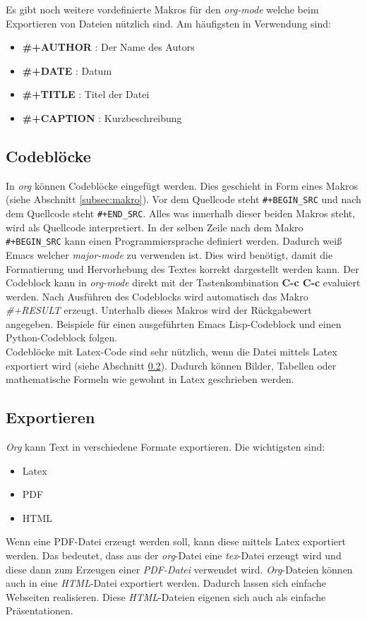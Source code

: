 Es gibt noch weitere vordefinierte Makros für den \textit{org-mode}
welche beim Exportieren von Dateien nützlich sind. Am häufigsten in
Verwendung sind:
\begin{itemize}
\item \textbf{\#+AUTHOR} : Der Name des Autors
\item \textbf{\#+DATE} : Datum
\item \textbf{\#+TITLE} : Titel der Datei
\item \textbf{\#+CAPTION} : Kurzbeschreibung
\end{itemize}

\subsection{Codeblöcke}
In \textit{org} können Codeblöcke eingefügt werden. Dies geschieht in
Form eines Makros (siehe Abschnitt \ref{subsec:makro}). Vor dem
Quellcode steht \texttt{\#+BEGIN\_SRC} und nach dem Quellcode steht
\texttt{\#+END\_SRC}. Alles was innerhalb dieser beiden Makros steht,
wird als Quellcode interpretiert. In der selben Zeile nach dem Makro
{\glqq}\texttt{\#+BEGIN\_SRC}{\grqq} kann einen Programmiersprache
definiert werden. Dadurch weiß Emacs welcher \textit{major-mode} zu
verwenden ist. Dies wird benötigt, damit die Formatierung und
Hervorhebung des Textes korrekt dargestellt werden kann. Der Codeblock
kann in \textit{org-mode} direkt mit der Tastenkombination \textbf{C-c
  C-c} evaluiert werden. Nach Ausführen des Codeblocks wird
automatisch das Makro \textit{\#+RESULT} erzeugt. Unterhalb dieses
Makros wird der Rückgabewert angegeben. Beispiele für einen
ausgeführten Emacs Lisp-Codeblock und einen Python-Codeblock folgen.\\



Codeblöcke mit Latex-Code sind sehr nützlich, wenn die Datei mittels
Latex exportiert wird (siehe Abschnitt \ref{subsec:export}). Dadurch
können Bilder, Tabellen oder mathematische Formeln wie gewohnt in
{\glqq}Latex{\grqq} geschrieben werden.\\

\subsection{Exportieren}
\label{subsec:export}
\textit{Org} kann Text in verschiedene {\glqq}Formate{\grqq}
exportieren. Die wichtigsten sind:
\begin{itemize}
\item Latex
\item PDF
\item HTML
\end{itemize}
Wenn eine PDF-Datei erzeugt werden soll, kann diese mittels Latex
exportiert werden. Das bedeutet, dass aus der \textit{org}-Datei eine
\textit{tex}-Datei erzeugt wird und diese dann zum Erzeugen einer
\textit{PDF-Datei} verwendet wird. \textit{Org}-Dateien können auch in
eine \textit{HTML}-Datei exportiert werden. Dadurch lassen sich
einfache Webseiten realisieren. Diese \textit{HTML}-Dateien eigenen
sich auch als einfache Präsentationen.\\

